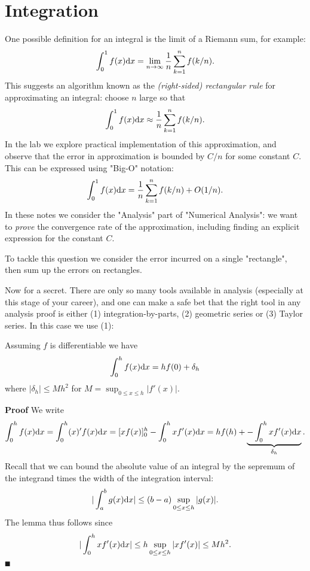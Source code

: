 
\section{Integration}
One possible definition for an integral is the limit of a Riemann sum, for example:
\[
  \ensuremath{\int}_0^1 f(x) {\rm d}x = \lim_{n \ensuremath{\rightarrow} \ensuremath{\infty}} {1 \over n} \ensuremath{\sum}_{k=1}^n f(k/n).
\]
This suggests an algorithm known as the \emph{(right-sided) rectangular rule} for approximating an integral: choose $n$ large so that
\[
  \ensuremath{\int}_0^1 f(x) {\rm d}x \ensuremath{\approx} {1 \over n} \ensuremath{\sum}_{k=1}^n f(k/n).
\]
In the lab we explore practical implementation of this approximation, and observe that the error in approximation is bounded by $C/n$ for some constant $C$. This can be expressed using "Big-O" notation:
\[
\ensuremath{\int}_0^1 f(x) {\rm d}x = {1 \over n} \ensuremath{\sum}_{k=1}^n f(k/n) + O(1/n).
\]
In these notes we consider the "Analysis" part of "Numerical Analysis": we want to \emph{prove} the convergence rate of the approximation, including finding an explicit expression for the constant $C$.

To tackle this question we consider the error incurred on a single "rectangle", then sum up the errors on rectangles.

Now for a secret. There are only so many tools available in analysis (especially at this stage of your career), and  one can make a safe bet that the right tool in any analysis proof is either (1) integration-by-parts, (2) geometric series or (3) Taylor series. In this case we use (1):

\begin{lemma} Assuming $f$ is differentiable we have
\[
\ensuremath{\int}_0^h f(x) {\rm d}x = h f(0) +  \ensuremath{\delta}_h
\]
where $|\ensuremath{\delta}_h| \ensuremath{\leq} M h^2$ for $M = \sup_{0 \ensuremath{\leq} x \ensuremath{\leq} h}|f'(x)|$.

\end{lemma}
\textbf{Proof} We write
\[
\ensuremath{\int}_0^h f(x) {\rm d}x = \ensuremath{\int}_0^h (x)' f(x)  {\rm d}x = [x f(x)]_0^h - \ensuremath{\int}_0^h x f'(x) {\rm d} x
= h f(h) + \underbrace{-\ensuremath{\int}_0^h x f'(x) {\rm d} x}_{\ensuremath{\delta}_h}.
\]
Recall that we can bound the absolute value of an integral by the sepremum of the integrand times the width of the integration interval:
\[
|\ensuremath{\int}_a^b g(x) {\rm d} x| \ensuremath{\leq} (b-a) \sup_{0 \ensuremath{\leq} x \ensuremath{\leq} h}|g(x)|.
\]
The lemma thus follows since
\[
|\ensuremath{\int}_0^h x f'(x) {\rm d} x| \ensuremath{\leq} h \sup_{0 \ensuremath{\leq} x \ensuremath{\leq} h}|x f'(x)| \ensuremath{\leq} M h^2.
\]
\ensuremath{\QED}



